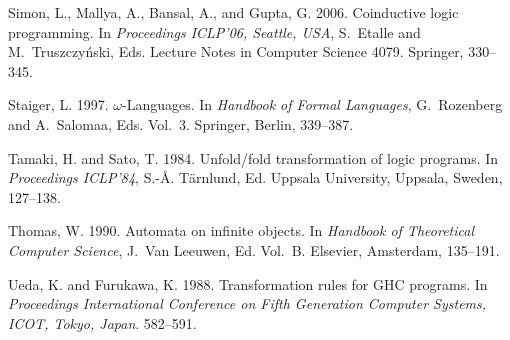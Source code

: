 \documentclass[english]{tlp}
\begin{document}
\begin{thebibliography}{}
{\sc Simon, L.}, {\sc Mallya, A.}, {\sc Bansal, A.}, {\sc and} {\sc Gupta, G.}
  2006.
\newblock Coinductive logic programming.
\newblock In {\em Proceedings ICLP'06, Seattle, USA}, {S.~Etalle} {and}
  {M.~Truszczy\'{n}ski}, Eds. Lecture Notes in Computer Science 4079. Springer,
  330--345.

{\sc Staiger, L.} 1997.
\newblock $\omega$-{L}anguages.
\newblock In {\em Handbook of Formal Languages}, {G.~Rozenberg} {and}
  {A.~Salomaa}, Eds. Vol.~3. Springer, Berlin, 339--387.

{\sc Tamaki, H.} {\sc and} {\sc Sato, T.} 1984.
\newblock Unfold/fold trans\-form\-ation of logic pro\-grams.
\newblock In {\em Proceedings ICLP'84}, {S.-{\AA}. T{{\"a}}rnlund}, 
Ed. Uppsala University,
  Uppsala, Sweden, 127--138.

{\sc Thomas, W.} 1990.
\newblock Automata on infinite objects.
\newblock In {\em Handbook of Theoretical Computer Science}, {J.~{Van
  Leeuwen}}, Ed. Vol.~B. Elsevier, Amsterdam, 135--191.

{\sc Ueda, K.} {\sc and} {\sc Furukawa, K.} 1988.
\newblock Trans\-formation rules for {GHC} pro\-grams.
\newblock In {\em Proceedings International Conference on Fifth Generation
  Computer Systems, ICOT, Tokyo, Japan}. 582--591.

\end{thebibliography}
\end{document}

